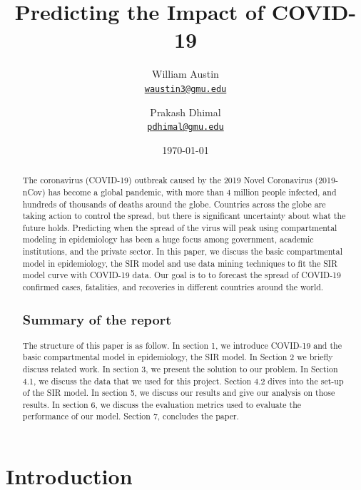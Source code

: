 \documentclass[11pt]{article}
\title{Predicting the Impact of COVID-19
}
\author{William Austin\\%
    \href{mailto:waustin3@gmu.edu}{\texttt{waustin3@gmu.edu}} %
\and Prakash Dhimal\\%
    \href{mailto:pdhimal@gmu.edu}{\texttt{pdhimal@gmu.edu}} %
    }
\date{\today}
\begin{document}
\maketitle
\begin{abstract}

The coronavirus (COVID-19) outbreak caused by the 2019 Novel Coronavirus (2019-nCov) has become a global pandemic, with more than 4 million people infected, and hundreds of thousands of deaths around the globe. Countries across the globe are taking action to control the spread, but there is significant uncertainty about what the future holds. Predicting when the spread of the virus will peak using compartmental modeling in epidemiology has been a huge focus among government, academic institutions, and the private sector. In this paper, we discuss the basic compartmental model in epidemiology, the SIR model and use data mining techniques to fit the SIR model curve with COVID-19 data. Our goal is to to forecast the spread of COVID-19 confirmed cases, fatalities, and recoveries in different countries around the world.

\subsection{Summary of the report}

The structure of this paper is as follow. In section 1, we introduce COVID-19 and the basic compartmental model in epidemiology, the SIR model. In Section 2 we briefly discuss related work. In section 3, we present the solution to our problem. In Section 4.1, we discuss the data that we used for this project. Section 4.2 dives into the set-up of the SIR model. In section 5, we discuss our results and give our analysis on those results. In section 6, we discuss the evaluation metrics used to evaluate the performance of our model. Section 7, concludes the paper.
\end{abstract}

\section{Introduction}
\end{document}
